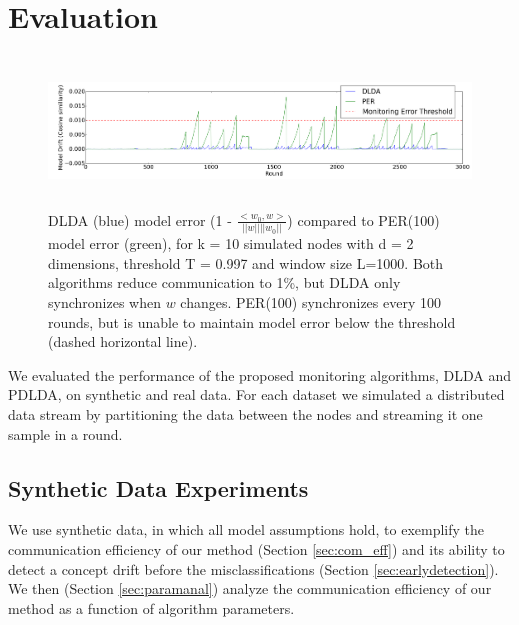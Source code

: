 \section{Evaluation}
\begin{figure}[ht]
	\centering
	\includegraphics[width=\textwidth, height=4cm]{PER/PERvsDLDAoverTime.png}
	\caption{ DLDA (blue) model error (1 - $\frac{<w_0,w>}{||w||||w_0||}$) compared to PER(100) model error (green),
	for k = 10 simulated nodes with d = 2 dimensions, threshold T = 0.997 and
	window size L=1000. Both algorithms reduce communication to 1\%, but DLDA
	only synchronizes when $w$ changes. PER(100) synchronizes every 100 rounds,
	but is unable to maintain model error below the threshold (dashed horizontal line).}
	\label{PERvsDLDAoverTime}
\end{figure}

We evaluated the performance of the proposed monitoring algorithms,
DLDA and PDLDA, on synthetic and real
data. For each dataset we simulated a distributed data stream by partitioning the data between the nodes and streaming it one sample in a round. 

\subsection{Synthetic Data Experiments}
We use synthetic data, in which all model assumptions hold, to
exemplify the communication efficiency of our method (Section \ref{sec:com_eff}) and its ability to detect a concept drift before the misclassifications (Section \ref{sec:earlydetection}). We then (Section \ref{sec:paramanal}) analyze the communication efficiency of our method as a function of algorithm parameters.

